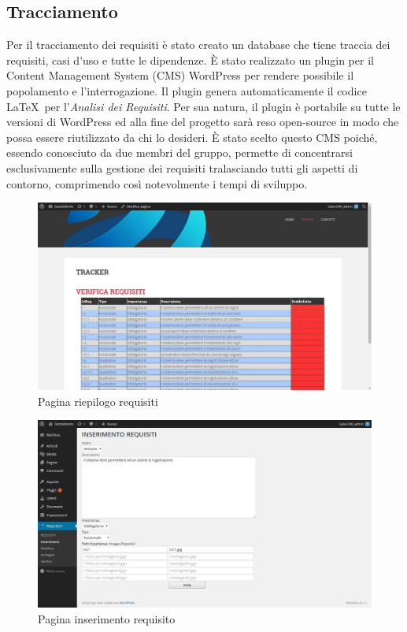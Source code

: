 \subsection{Tracciamento}
Per il tracciamento dei requisiti è stato creato un \gls{database} che tiene traccia dei requisiti, \gls{casi d'uso} e tutte le dipendenze.
È stato realizzato un \gls{plugin} per il Content Management System (\gls{CMS}) \gls{WordPress} per rendere possibile il popolamento e l'interrogazione.
Il \gls{plugin} genera automaticamente il codice \LaTeX\ per l'\textit{Analisi dei Requisiti}.
Per sua natura, il \gls{plugin} è portabile su tutte le versioni di \gls{WordPress} ed alla fine del progetto sarà reso open-source in modo che possa essere riutilizzato da chi lo desideri. È stato scelto questo \gls{CMS} poiché, essendo conosciuto da due membri del gruppo, permette di concentrarsi esclusivamente sulla gestione dei requisiti tralasciando tutti gli aspetti di contorno, comprimendo così notevolmente i tempi di sviluppo.
\begin{figure}[h]
\centering
\includegraphics[width=0.7\linewidth]{img/tracker1}
\caption[Pagina riepilogo requisiti]{Pagina riepilogo requisiti}
\label{fig:tracker1}
\end{figure}
\begin{figure}[h]
\centering
\includegraphics[width=0.7\linewidth]{img/tracker2}
\caption[Pagina inserimento requisito]{Pagina inserimento requisito}
\label{fig:tracker2}
\end{figure}


